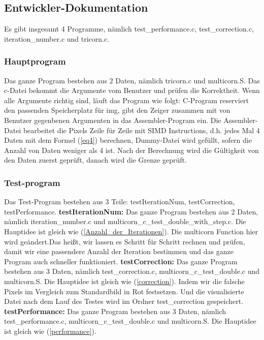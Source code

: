 \documentclass[course=erap]{aspdoc}
\begin{document}
\subsection{Entwickler-Dokumentation}
Es gibt insgesamt 4 Programme, nämlich test\_performance.c, test\_correction.c, iteration\_number.c und tricorn.c.
\subsubsection{Hauptprogram}
Das ganze Program bestehen aus 2 Daten, nämlich tricorn.c und multicorn.S. Das c-Datei bekommt die Argumente vom Benutzer und prüfen die Korrektheit. Wenn alle Argumente richtig sind, läuft das Program wie folgt: \newline
C-Program reserviert den passenden Speicherplatz für img, gibt den Zeiger zusammen mit von Benutzer gegenbenen Argumenten in das Assembler-Program ein. Die Assembler-Datei bearbeitet die Pixels Zeile für Zeile mit SIMD Instructions, d.h. jedes Mal 4 Daten mit dem Formel (\ref{eq4}) berechnen, Dummy-Datei wird gefüllt, sofern die Anzahl von Daten weniger als 4 ist. Nach der Berechnung wird die Gültigkeit von den Daten zuerst geprüft, danach wird die Grenze geprüft.
\subsubsection{Test-program}
Das Test-Program bestehen aus 3 Teile: testIterationNum, testCorrection, testPerformance.\newline
\textbf{testIterationNum:} Das ganze Program bestehen aus 2 Daten, nämlich iteration\_number.c und multicorn\_c\_test\_double\_with\_step.c. Die Hauptidee ist gleich wie  (\ref{Anzahl_der_Iterationen}). Die multicorn Function hier wird geändert.Das heißt, wir lassen es Schritt für Schritt rechnen und prüfen, damit wir eine passendere Anzahl der Iteration bestimmen und das ganze Program auch schneller funktioniert. \newline
\textbf{testCorrection:} Das ganze Program bestehen aus 3 Daten, nämlich test\_correction.c, multicorn\_c\_test\_double.c und multicorn.S. Die Hauptidee ist gleich wie  (\ref{correction}). Indem wir die falsche Pixels im Vergleich zum Standardbild in Rot festsetzen. Und die visualisierte Datei nach dem Lauf des Testes wird im Ordner test\_correction gespeichert.\newline
\textbf{testPerformance:} Das ganze Program bestehen aus 3 Daten, nämlich test\_performance.c, multicorn\_c\_test\_double.c und multicorn.S. Die Hauptidee ist gleich wie  (\ref{performance}).
\end{document}
